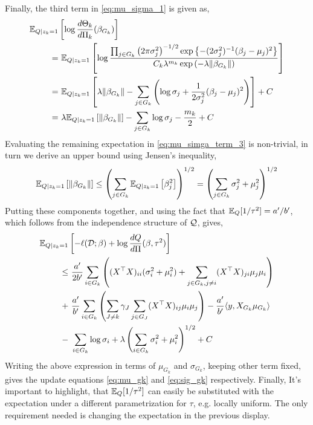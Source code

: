 Finally, the third term in \eqref{eq:mu_sigma_1} is given as,
{\allowdisplaybreaks
\begin{align}
    \mathbb{E}_{Q | z_k = 1 } & \left[ \log \frac{d\Theta_k}{d\Pi_k} (\beta_{G_k}) \right]
    \nonumber \\
= &\
    \mathbb{E}_{Q | z_k = 1 } \left[ 
	\log \frac
	{\prod_{j \in G_k} \left( 2 \pi \sigma_j^2 \right)^{-1/2} \exp \left\{ -(2\sigma^2_{j})^{-1}(\beta_{j} - \mu_j )^2 \right\}}
	{C_k \lambda^{m_k} \exp\left( - \lambda \| \beta_{G_k} \| \right)}
    \right] \nonumber \\
= &\
    \mathbb{E}_{Q | z_k = 1 } \left[ 
	\lambda \| \beta_{G_k} \|
	- \sum_{j \in G_k} \left( 
	    \log{\sigma_j} 
	    + \frac{1}{2\sigma_j^2} (\beta_{j} - \mu_j)^2
	\right)
    \right] + C \nonumber \\
= &\
    \lambda \mathbb{E}_{Q | z_k = 1 } \left[ 
	\| \beta_{G_k} \|
    \right] 
    - \sum_{j \in G_k} \log{\sigma_j} 
    - \frac{m_k}{2} 
    + C 
    \label{eq:mu_simga_term_3}
\end{align} }%
Evaluating the remaining expectation in \eqref{eq:mu_simga_term_3} is non-trivial, in turn we derive an upper bound using Jensen's inequality,
\begin{equation} \label{eq:mu_sigma_upper}
    \mathbb{E}_{Q | z_k = 1 } \left[ 
	\| \beta_{G_k} \|
    \right] 
\leq
    \left( \sum_{j \in G_k} 
	\mathbb{E}_{Q | z_k = 1 } \left[ \beta_{j}^2 \right] 
    \right)^{1/2} 
=
    \left( \sum_{j \in G_k} 
	\sigma_j^2 + \mu_j^2
    \right)^{1/2} 
\end{equation}
Putting these components together, and using the fact that $\mathbb{E}_Q [ 1 / \tau^{2} ] = a' / b'$, which follows from the independence structure of $\mathcal{Q}$, gives,
\begin{equation} \label{eq:mu_sigma_main}
\begin{aligned}
    \mathbb{E}_{Q  | z_k = 1} & \left[ 
	- \ell(\mathcal{D}; \beta) + \log \frac{dQ}{d\Pi}(\beta, \tau^2) 
    \right]  \\
\leq &\
    \frac{a'}{2b'} 
    \sum_{i \in G_k} \left( 
	    (X^\top X)_{ii} (\sigma_i^2 + \mu_i^2)
	+
	\sum_{j \in G_k, j\neq i} 
	    (X^\top X)_{ji} \mu_j \mu_i
    \right ) \\
+ &\
    \frac{a'}{b'} 
    \sum_{i \in G_k} \left( 
	\sum_{J \neq k} \gamma_{J} 
	\sum_{j \in G_J} (X^\top X)_{ij} \mu_i \mu_j
    \right )
-
    \frac{a'}{b'}
    \langle y, X_{G_k} \mu_{G_k} \rangle   \\
- &\
    \sum_{i \in G_k} \log{\sigma_i}
+
    \lambda \left( \sum_{i \in G_k} 
	\sigma_i^2 + \mu_i^2
    \right)^{1/2} + C
\end{aligned}
\end{equation}
Writing the above expression in terms of $\mu_{G_k}$ and $\sigma_{G_k}$, keeping other term fixed, gives the update equations \eqref{eq:mu_gk} and \eqref{eq:sig_gk} respectively. Finally, It's important to highlight, that $\mathbb{E}_Q[1/\tau^2]$ can easily be substituted with the expectation under a different parametrization for $\tau$, e.g. locally uniform. The only requirement needed is changing the expectation in the previous display.

